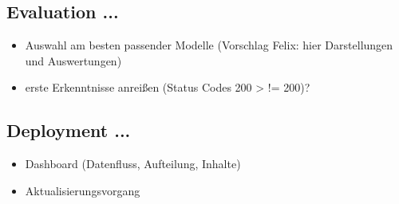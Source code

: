 \subsection{Evaluation ...}\label{subsec:evaluation}
\begin{itemize}
    \item Auswahl am besten passender Modelle (Vorschlag Felix: hier Darstellungen und Auswertungen)
    \item erste Erkenntnisse anreißen (Status Codes 200 > != 200)?
\end{itemize}

\subsection{Deployment ...}\label{subsec:deployment}
\begin{itemize}
    \item Dashboard (Datenfluss, Aufteilung, Inhalte)
    \item Aktualisierungsvorgang
\end{itemize}
